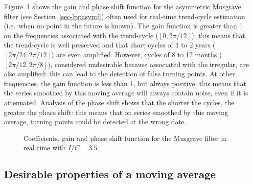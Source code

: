 \documentclass[
]{article}
\newcommand\1{\mathds{1}}
\begin{document}
Figure~\ref{fig-graphsmusgrave} shows the gain and phase shift function
for the asymmetric Musgrave filter (see Section~\ref{sec-lppasymf})
often used for real-time trend-cycle estimation (i.e.~when no point in
the future is known). The gain function is greater than 1 on the
frequencies associated with the trend-cycle (\([0, 2\pi/12]\)): this
means that the trend-cycle is well preserved and that short cycles of 1
to 2 years (\([2\pi/24,2\pi/12]\)) are even amplified. However, cycles
of 8 to 12 months (\([2\pi/12, 2\pi/8]\)), considered undesirable
because associated with the irregular, are also amplified: this can lead
to the detection of false turning points. At other frequencies, the gain
function is less than 1, but always positive: this means that the series
smoothed by this moving average will always contain noise, even if it is
attenuated. Analysis of the phase shift shows that the shorter the
cycles, the greater the phase shift: this means that on series smoothed
by this moving average, turning points could be detected at the wrong
date.

\begin{figure}[H]

\caption{\label{fig-graphsmusgrave}Coefficients, gain and phase shift
function for the Musgrave filter in real time with \(I/C=3.5\).}


\end{figure}%

\subsection{Desirable properties of a moving
average}\label{desirable-properties-of-a-moving-average}
\end{document}
